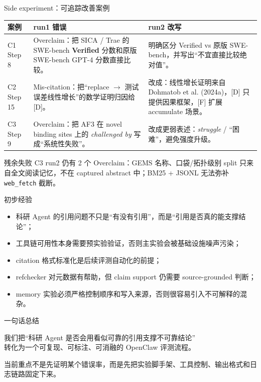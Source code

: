 \documentclass[UTF8,fontset=fandol,aspectratio=169]{ctexbeamer}
\begin{document}
\begin{frame}{Side experiment：可追踪改善案例}
  \scriptsize
  \begin{tabularx}{\textwidth}{@{}p{}X X@{}}
    \toprule
    \textbf{案例} & \textbf{run1 错误} & \textbf{run2 改写} \\
    \midrule
    C1 Step 8 &
    Overclaim：把 SICA / Trae 的 SWE-bench \textbf{Verified} 分数和原版 SWE-bench GPT-4 分数直接比较。 &
    明确区分 Verified vs 原版 SWE-bench，并写出“不宜直接比较绝对值”。 \\
    \addlinespace[0.25em]
    C2 Step 15 &
    Mis-citation：把“replace $\rightarrow$ 测试误差线性增长”的数学证明归因给 [D]。 &
    改成：线性增长证明来自 Dohmatob et al. (2024a)，[D] 只提供因果框架，[F] 扩展 accumulate 场景。 \\
    \addlinespace[0.25em]
    C3 Step 9 &
    Overclaim：把 AF3 在 novel binding sites 上的 \textit{challenged by} 写成“系统性失败”。 &
    改成更弱表述：\textit{struggle} / “困难”，避免强度升级。 \\
    \bottomrule
  \end{tabularx}

  \vspace{0.5em}
  \begin{alertblock}{残余失败}
    C3 run2 仍有 2 个 Overclaim：GEMS 名称、口袋/拓扑级别 split 只来自全文阅读记忆，不在 captured abstract 中；BM25 + JSONL 无法弥补 \texttt{web\_fetch} 截断。
  \end{alertblock}
\end{frame}

\begin{frame}{初步经验}
  \begin{itemize}
    \item 科研 Agent 的引用问题不只是“有没有引用”，而是“引用是否真的能支撑结论”；
    \item 工具链可用性本身需要预实验验证，否则主实验会被基础设施噪声污染；
    \item citation 格式标准化是后续评测自动化的前提；
    \item refchecker 对元数据有帮助，但 claim support 仍需要 source-grounded 判断；
    \item memory 实验必须严格控制顺序和写入来源，否则很容易引入不可解释的混杂。
  \end{itemize}
\end{frame}

\begin{frame}{一句话总结}
  \begin{center}
    \Large
    我们把“科研 Agent 是否会用看似可靠的引用支撑不可靠结论”\\
    转化为一个可复现、可标注、可消融的 OpenClaw 评测流程。
  \end{center}

  \vspace{1em}
  \begin{center}
    \normalsize
    当前重点不是先证明某个错误率，而是先把实验脚手架、工具控制、输出格式和日志链路固定下来。
  \end{center}
\end{frame}
\end{document}
